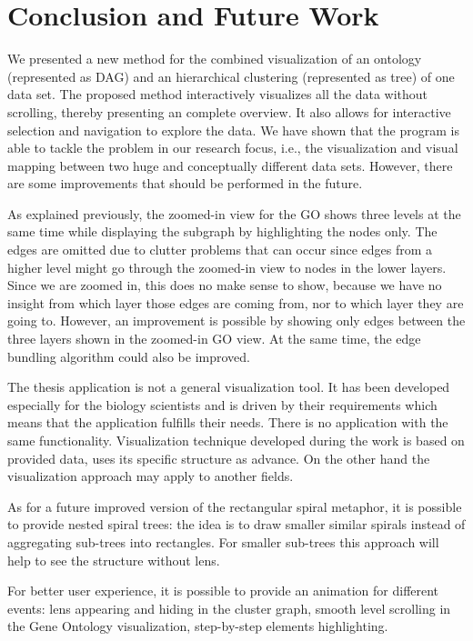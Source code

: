 \section{Conclusion and Future Work}
\label{sec:conclusion}

We presented a new method for the combined visualization of an ontology (represented as DAG) and an hierarchical clustering (represented as tree) of one data set. The proposed method interactively visualizes all the data without scrolling, thereby presenting an complete overview. It also allows for interactive selection and navigation to explore the data. We have shown that the program is able to tackle the problem in our research focus, i.e., the visualization and visual mapping between two huge and conceptually different data sets. However, there are some improvements that should be performed in the future.

As explained previously, the zoomed-in view for the GO shows three levels at the same time while displaying the subgraph by highlighting the nodes only. The edges are omitted due to clutter problems that can occur since edges from a higher level might go through the zoomed-in view to nodes in the lower layers. Since we are zoomed in, this does no make sense to show, because we have no insight from which layer those edges are coming from, nor to which layer they are going to. However, an improvement is possible by showing only edges between the three layers shown in the zoomed-in GO view. At the same time, the edge bundling algorithm could also be improved.

The thesis application is not a general visualization tool. It has been developed especially for the biology scientists and is driven by their requirements which means that the application fulfills their needs. There is no application with the same functionality. Visualization technique developed during the work is based on provided data, uses its specific structure as advance. On the other hand the visualization approach may apply to another fields.

As for a future improved version of the rectangular spiral metaphor, it is possible to provide nested spiral trees: the idea is to draw smaller similar spirals instead of aggregating sub-trees into rectangles. For smaller sub-trees this approach will help to see the structure without lens.

For better user experience, it is possible to provide an animation for different events: lens appearing and hiding in the cluster graph, smooth level scrolling in the Gene Ontology visualization, step-by-step elements highlighting.
